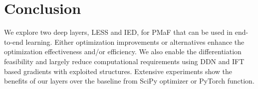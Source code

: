 \documentclass{article}
\newcommand{\mb}[1]{\mathbf{#1}}
\theoremstyle{plain}
\theoremstyle{definition}
\theoremstyle{remark}
\begin{document}
\begin{table}[!ht]
\centering
\small
\caption{\textit{Efficiency evaluation with symmetric $\mb{A}$ and solution size 5 $\times$ 512.
``J": autodiff Jacobian without exploited structures;
``E": our differentiation with exploited structures.
See the Appendix for results with nonsymmetric $\mb{A}$ and more sizes.}
}
\label{tb:ied_symmetric_tease}
\setlength{\tabcolsep}{6.5pt}
\end{table}

\section{Conclusion}
We explore two deep layers, LESS and IED, for PMaF that can be used in end-to-end learning.
Either optimization improvements or alternatives enhance the optimization effectiveness and/or efficiency.
We also enable the differentiation feasibility and largely reduce computational requirements using
DDN and IFT based gradients with exploited structures.
Extensive experiments show the benefits of our layers over the baseline from SciPy optimizer or PyTorch function.

\clearpage






\end{document}
